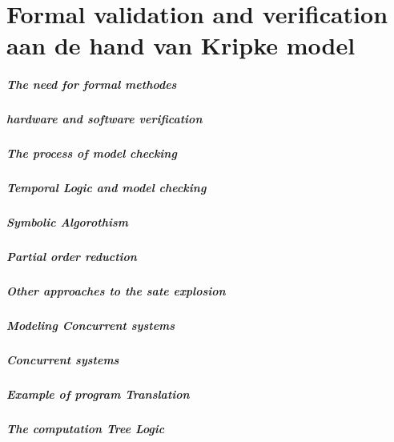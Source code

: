 


\chapter{Formal validation and verification aan de hand van Kripke model}

\paragraph{The need for formal methodes}
\paragraph{hardware and software verification}
\paragraph{The process of model checking}
\paragraph{Temporal Logic and model checking}
\paragraph{Symbolic  Algorothism}
\paragraph{Partial order reduction}
\paragraph{Other approaches to the sate explosion}
\paragraph{Modeling Concurrent systems}
\paragraph{Concurrent systems}
\paragraph{Example of program Translation}
\paragraph{The computation Tree Logic}
